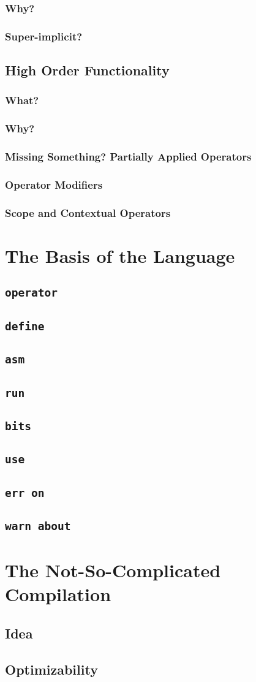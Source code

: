 \documentclass{article}
\newcommand{\secl}[1]{\section{#1}\label{sec:#1}}
\newcommand{\ssecl}[1]{\subsection{#1}\label{ssec:#1}}
\newcommand{\sssecl}[1]{\subsubsection{#1}\label{sssec:#1}}
\begin{document}
\sssecl{Why?}

\sssecl{Super-implicit?}

\ssecl{High Order Functionality}
\sssecl{What?}

\sssecl{Why?}

\sssecl{Missing Something? Partially Applied Operators}

\sssecl{Operator Modifiers}

\sssecl{Scope and Contextual Operators}

\secl{The Basis of the Language}
\ssecl{\texttt{\textbf{operator}}}

\ssecl{\texttt{\textbf{define}}}

\ssecl{\texttt{\textbf{asm}}}

\ssecl{\texttt{\textbf{run}}}

\ssecl{\texttt{\textbf{bits}}}

\ssecl{\texttt{\textbf{use}}}

\ssecl{\texttt{\textbf{err on}}}
\ssecl{\texttt{\textbf{warn about}}}
\secl{The Not-So-Complicated Compilation}
\ssecl{Idea}

\ssecl{Optimizability}
\end{document}
